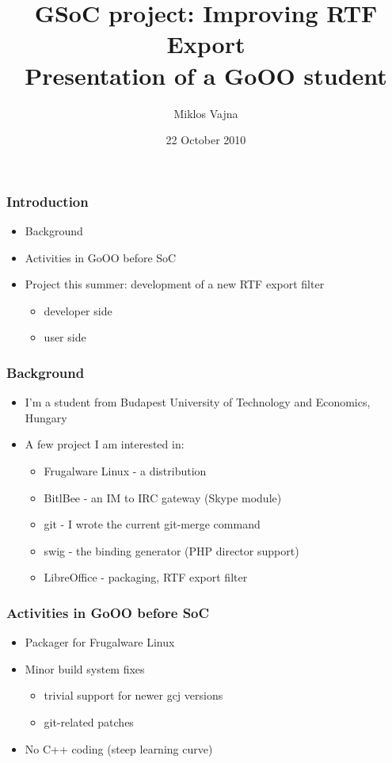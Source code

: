 \documentclass[hyperref={pdfpagelabels=false}]{beamer}
\author{Miklos Vajna}
\begin{document}
\title{GSoC project: Improving RTF Export \\ Presentation of a GoOO student}
\date{22 October 2010}

\frame{\titlepage}

\begin{frame}
\frametitle{Introduction}
\begin{itemize}
\item Background
\item Activities in GoOO before SoC
\item Project this summer: development of a new RTF export filter
\begin{itemize}
\item developer side
\item user side
\end{itemize}
\end{itemize}
\end{frame}


\begin{frame}
\frametitle{Background}
\begin{itemize}
\item I'm a student from Budapest University of Technology and Economics, Hungary
\item A few project I am interested in:
\begin{itemize}
\item Frugalware Linux - a distribution
\item BitlBee - an IM to IRC gateway (Skype module)
\item git - I wrote the current git-merge command
\item swig - the binding generator (PHP director support)
\item LibreOffice - packaging, RTF export filter
\end{itemize}
\end{itemize}
\end{frame}

\begin{frame}
\frametitle{Activities in GoOO before SoC}
\begin{itemize}
\item Packager for Frugalware Linux
\item Minor build system fixes
\begin{itemize}
\item trivial support for newer gcj versions
\item git-related patches
\end{itemize}
\item No C++ coding (steep learning curve)
\end{itemize}
\end{frame}
\end{document}
